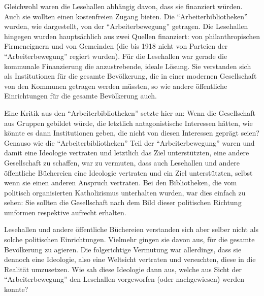 \documentclass[a4paper,
fontsize=11pt,
oneside,
numbers=noperiodatend,
parskip=half-,
bibliography=totoc,
final
]{scrartcl}
\begin{document}
Gleichwohl waren die Lesehallen abhängig davon, dass sie finanziert
würden. Auch sie wollten einen kostenfreien Zugang bieten. Die
\enquote{Arbeiterbibliotheken} wurden, wie dargestellt, von der
\enquote{Arbeiterbewegung} getragen. Die Lesehallen hingegen wurden
hauptsächlich aus zwei Quellen finanziert: von philanthropischen
Firmeneignern und von Gemeinden (die bis 1918 nicht von Parteien der
\enquote{Arbeiterbewegung} regiert wurden). Für die Lesehallen war
gerade die kommunale Finanzierung die anzustrebende, ideale Lösung. Sie
verstanden sich als Institutionen für die gesamte Bevölkerung, die in
einer modernen Gesellschaft von den Kommunen getragen werden müssten, so
wie andere öffentliche Einrichtungen für die gesamte Bevölkerung auch.

Eine Kritik aus den \enquote{Arbeiterbibliotheken} setzte hier an: Wenn
die Gesellschaft aus Gruppen gebildet würde, die letztlich
antagonistische Interessen hätten, wie könnte es dann Institutionen
geben, die nicht von diesen Interessen geprägt seien? Genauso wie die
\enquote{Arbeiterbibliotheken} Teil der \enquote{Arbeiterbewegung} waren
und damit eine Ideologie vertraten und letztlich das Ziel unterstützten,
eine andere Gesellschaft zu schaffen, war zu vermuten, dass auch
Lesehallen und andere öffentliche Büchereien eine Ideologie vertraten
und ein Ziel unterstützten, selbst wenn sie einen anderen Anspruch
vertraten. Bei den Bibliotheken, die vom politisch organisierten
Katholizismus unterhalten wurden, war dies einfach zu sehen: Sie sollten
die Gesellschaft nach dem Bild dieser politischen Richtung umformen
respektive aufrecht erhalten.

Lesehallen und andere öffentliche Büchereien verstanden sich aber selber
nicht als solche politischen Einrichtungen. Vielmehr gingen sie davon
aus, für die gesamte Bevölkerung zu agieren. Die folgerichtige Vermutung
war allerdings, dass sie dennoch eine Ideologie, also eine Weltsicht
vertraten und versuchten, diese in die Realität umzusetzen. Wie sah
diese Ideologie dann aus, welche aus Sicht der
\enquote{Arbeiterbewegung} den Lesehallen vorgeworfen (oder
nachgewiesen) werden konnte?
\end{document}
